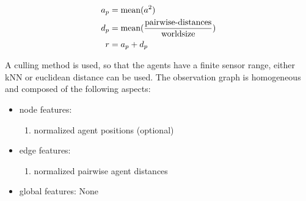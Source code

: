 \begin{equation}
    \begin{aligned}
        a_p &= \textup{mean}(a^2)\\
        d_p &= \textup{mean}(\frac{\textup{pairwise-distances}}{\textup{worldsize}}) \\
        r &= a_p + d_p
    \end{aligned}
    \nonumber
\end{equation}

A culling method is used, so that the agents have a finite sensor range, either kNN or euclidean distance can be used. The observation graph is homogeneous and composed of the following aspects:
\begin{itemize}[noitemsep,nolistsep]
    \item node features:
    \begin{enumerate}
        \item normalized agent positions (optional)
    \end{enumerate} 
    \item edge features:
    \begin{enumerate}
        \item normalized pairwise agent distances
    \end{enumerate} 
    \item global features: None
\end{itemize}



